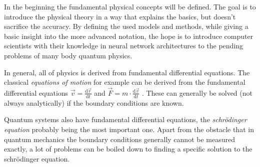 In the beginning the fundamental physical concepts will be defined. 
The goal is to introduce the physical theory in a way that explains the basics, but doesn't sacrifice the accuracy. 
By defining the used models and methods, while giving a basic insight into the more advanced notation, the hope is to introduce computer scientists with their knowledge in neural network architectures to the pending problems of many body quantum physics.

In general, all of physics is derived from fundamental differential equations. 
The classical \emph{equations of motion} for example can be derived from the fundamental differential equations $\vec{v} = \frac{\mathrm{d}\vec{r}}{\mathrm{d}t}$ and $\vec{F} = m \cdot \frac{\mathrm{d}\vec{v}}{\mathrm{d}t}$ \cite*[]{demtroderExperimentalphysik}.
These can generally be solved (not always analytically) if the boundary conditions are known.

Quantum systems also have fundamental differential equations, the \emph{schrödinger equation} probably being the most important one. Apart from the obstacle that in quantum mechanics the boundary conditions generally cannot be measured exactly, a lot of problems can be boiled down to finding a specific solution to the schrödinger equation.